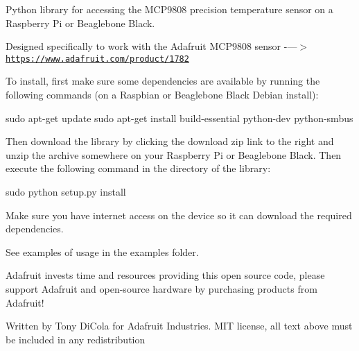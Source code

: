 Python library for accessing the M\+C\+P9808 precision temperature sensor on a Raspberry Pi or Beaglebone Black.

Designed specifically to work with the Adafruit M\+C\+P9808 sensor -\/---$>$ \href{https://www.adafruit.com/product/1782}{\tt https\+://www.\+adafruit.\+com/product/1782}

To install, first make sure some dependencies are available by running the following commands (on a Raspbian or Beaglebone Black Debian install)\+:


\begin{DoxyCode}
sudo apt-get update
sudo apt-get install build-essential python-dev python-smbus
\end{DoxyCode}


Then download the library by clicking the download zip link to the right and unzip the archive somewhere on your Raspberry Pi or Beaglebone Black. Then execute the following command in the directory of the library\+:


\begin{DoxyCode}
sudo python setup.py install
\end{DoxyCode}


Make sure you have internet access on the device so it can download the required dependencies.

See examples of usage in the examples folder.

Adafruit invests time and resources providing this open source code, please support Adafruit and open-\/source hardware by purchasing products from Adafruit!

Written by Tony Di\+Cola for Adafruit Industries. M\+IT license, all text above must be included in any redistribution 